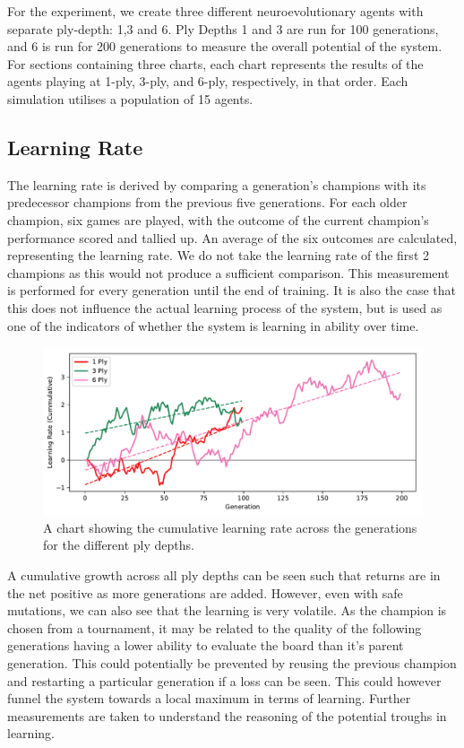 \documentclass[12pt,a4paper]{article}
\begin{document}
    For the experiment, we create three different neuroevolutionary agents with separate ply-depth: 1,3 and 6. Ply Depths 1 and 3 are run for 100 generations, and 6 is run for 200 generations to measure the overall potential of the system. For sections containing three charts, each chart represents the results of the agents playing at 1-ply, 3-ply, and 6-ply, respectively, in that order. Each simulation utilises a population of 15 agents.

    \subsection{Learning Rate}
    
    The learning rate is derived by comparing a generation's champions with its predecessor  champions from the previous five generations. For each older champion, six games are played, with the outcome of the current champion's performance scored and tallied up. An average of the six outcomes are calculated, representing the learning rate. We do not take the learning rate of the first 2 champions as this would not produce a sufficient comparison. This measurement is performed for every generation until the end of training. It is also the case that this does not influence the actual learning process of the system, but is used as one of the indicators of whether the system is learning in ability over time.
    
    \begin{figure}[!ht]
        \centering
        \includegraphics[width=160mm]{images/results/combined_cummulative.pdf}
        \caption{A chart showing the cumulative learning rate across the generations for the different ply depths.\label{cum_growth}}
    \end{figure}
    
    A cumulative growth across all ply depths can be seen such that returns are in the net positive as more generations are added. However, even with safe mutations, we can also see that the learning is very volatile. As the champion is chosen from a tournament, it may be related to the quality of the following generations having a lower ability to evaluate the board than it's parent generation. This could potentially be prevented by reusing the previous champion and restarting a particular generation if a loss can be seen. This could however funnel the system towards a local maximum in terms of learning. Further measurements are taken to understand the reasoning of the potential troughs in learning. 
    
\end{document}
